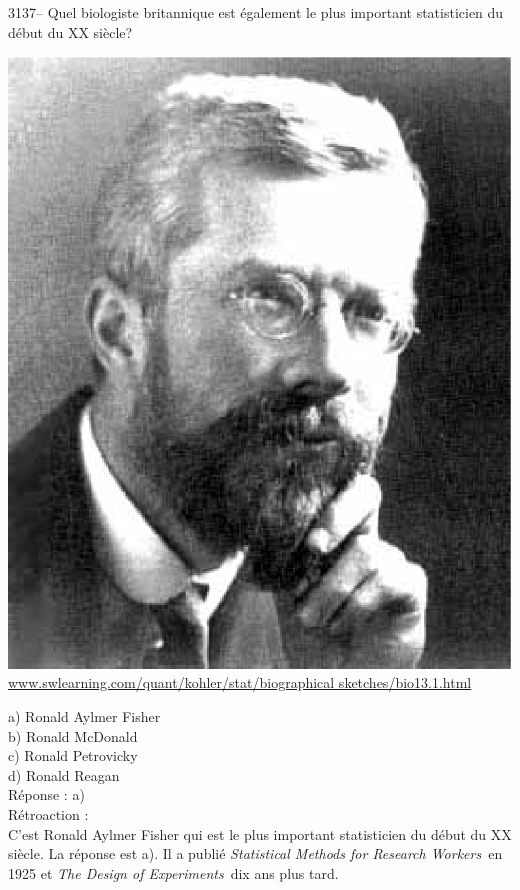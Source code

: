 \documentclass[letterpaper, 12pt]{article}
\begin{document}
3137-- Quel biologiste britannique est \'egalement le plus important statisticien du d\'ebut du {\scriptsize XX\ieme{}} si\`ecle?
\begin{center}
\includegraphics[scale=0.27]{Fisher.eps}\\
\href{http://www.swlearning.com/quant/kohler/stat/biographical_sketches/bio13.1.html}{www.swlearning.com/quant/kohler/stat/biographical sketches/bio13.1.html}\\
\end{center}

a) Ronald Aylmer Fisher\\
b) Ronald McDonald\\
c) Ronald Petrovicky\\
d) Ronald Reagan\\

R\'eponse : a)\\

R\'etroaction :\\
C'est Ronald Aylmer Fisher qui est le plus important statisticien du d\'ebut du {\scriptsize XX\ieme{}} si\`ecle. La r\'eponse est a). Il a publi\'e \og \emph{Statistical Methods for Research Workers}\fg \ en 1925 et \og \emph{The Design of Experiments}\fg \ dix ans plus tard.\\
\end{document}
